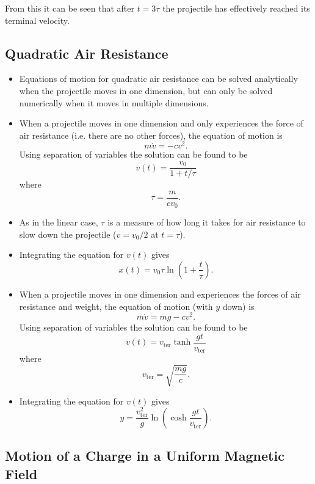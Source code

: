 \documentclass{article}
\begin{document}
\begin{itemize}
\begin{itemize}
                From this it can be seen that after $t = 3 \tau$ the projectile has effectively reached its terminal velocity.
        \end{itemize}
\end{itemize}

\setcounter{subsection}{3}
\subsection{Quadratic Air Resistance}

\begin{itemize}
  \item Equations of motion for quadratic air resistance can be solved analytically when the projectile moves in one dimension, but can only be solved numerically when it moves in multiple dimensions.

  \item When a projectile moves in one dimension and only experiences the force of air resistance (i.e. there are no other forces), the equation of motion is \[m \dot{v} = -c v^2.\] Using separation of variables the solution can be found to be \[v(t) = \frac{v_0}{1 + t / \tau}\] where \[\tau = \frac{m}{c v_0}.\]

  \item As in the linear case, $\tau$ is a measure of how long it takes for air resistance to slow down the projectile ($v = v_0 / 2$ at $t = \tau$).

  \item Integrating the equation for $v(t)$ gives \[x(t) = v_0 \tau \ln \left( 1 + \frac{t}{\tau} \right).\]

  \item When a projectile moves in one dimension and experiences the forces of air resistance and weight, the equation of motion (with $y$ down) is \[m \dot{v} = m g - c v^2.\] Using separation of variables the solution can be found to be \[v(t) = v_\text{ter} \tanh \frac{g t}{v_\text{ter}}\] where \[v_\text{ter} = \sqrt{\frac{m g}{c}}.\]

  \item Integrating the equation for $v(t)$ gives \[y = \frac{v_\text{ter}^2}{g} \ln \left( \cosh \frac{g t}{v_\text{ter}} \right).\]
\end{itemize}

\subsection{Motion of a Charge in a Uniform Magnetic Field}
\end{document}
